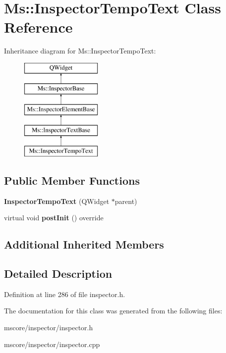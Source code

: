 \hypertarget{class_ms_1_1_inspector_tempo_text}{}\section{Ms\+:\+:Inspector\+Tempo\+Text Class Reference}
\label{class_ms_1_1_inspector_tempo_text}
Inheritance diagram for Ms\+:\+:Inspector\+Tempo\+Text\+:\begin{figure}[H]
\begin{center}
\leavevmode
\includegraphics[height=5.000000cm]{class_ms_1_1_inspector_tempo_text}
\end{center}
\end{figure}
\subsection*{Public Member Functions}
\begin{DoxyCompactItemize}
\item 
\mbox{\label{class_ms_1_1_inspector_tempo_text_a96a0dee250cb19c067f7036918584d29}} 
{\bfseries Inspector\+Tempo\+Text} (Q\+Widget $\ast$parent)
\item 
\mbox{\label{class_ms_1_1_inspector_tempo_text_ad597ce05e6ec0bcd88fba9e0b47dad2d}} 
virtual void {\bfseries post\+Init} () override
\end{DoxyCompactItemize}
\subsection*{Additional Inherited Members}


\subsection{Detailed Description}


Definition at line 286 of file inspector.\+h.



The documentation for this class was generated from the following files\+:\begin{DoxyCompactItemize}
\item 
mscore/inspector/inspector.\+h\item 
mscore/inspector/inspector.\+cpp\end{DoxyCompactItemize}
